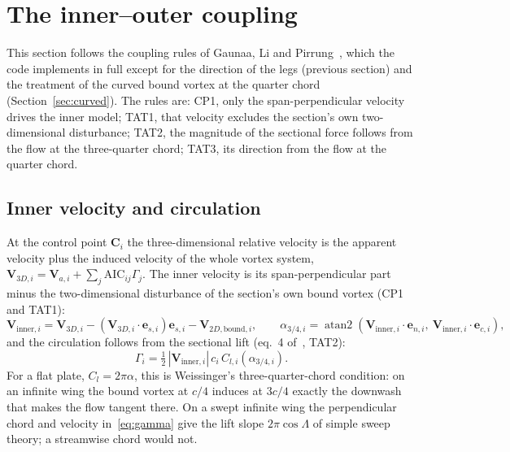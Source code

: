 \documentclass[11pt,a4paper]{article}
\newcommand{\vect}[1]{\mathbf{#1}}
\begin{document}
\section{The inner--outer coupling}
\label{sec:coupling}
This section follows the coupling rules of Gaunaa, Li and Pirrung~\cite{gaunaa2026}, which the code implements in full except for the direction of the legs (previous section) and the treatment of the curved bound vortex at the quarter chord (Section~\ref{sec:curved}). The rules are: CP1, only the span-perpendicular velocity drives the inner model; TAT1, that velocity excludes the section's own two-dimensional disturbance; TAT2, the magnitude of the sectional force follows from the flow at the three-quarter chord; TAT3, its direction from the flow at the quarter chord.

\subsection{Inner velocity and circulation}
\label{sec:gamma}
At the control point $\vect C_i$ the three-dimensional relative velocity is the apparent velocity plus the induced velocity of the whole vortex system, $\vect V_{3D,i}=\vect V_{a,i}+\sum_j \mathrm{AIC}_{ij}\Gamma_j$. The inner velocity is its span-perpendicular part minus the two-dimensional disturbance of the section's own bound vortex (CP1 and TAT1):
\begin{equation}
\vect V_{\mathrm{inner},i}=\vect V_{3D,i}-(\vect V_{3D,i}\cdot\vect e_{s,i})\vect e_{s,i}-\vect V_{2D,\mathrm{bound},i},\qquad
\alpha_{3/4,i}=\operatorname{atan2}(\vect V_{\mathrm{inner},i}\cdot\vect e_{n,i},\ \vect V_{\mathrm{inner},i}\cdot\vect e_{c,i}),
\end{equation}
and the circulation follows from the sectional lift (eq.~4 of~\cite{gaunaa2026}, TAT2):
\begin{equation}
\Gamma_i=\tfrac12\,|\vect V_{\mathrm{inner},i}|\,c_i\,C_{l,i}(\alpha_{3/4,i}).
\label{eq:gamma}
\end{equation}
For a flat plate, $C_l=2\pi\alpha$, this is Weissinger's three-quarter-chord condition: on an infinite wing the bound vortex at $c/4$ induces at $3c/4$ exactly the downwash that makes the flow tangent there. On a swept infinite wing the perpendicular chord and velocity in~\eqref{eq:gamma} give the lift slope $2\pi\cos\Lambda$ of simple sweep theory; a streamwise chord would not.
\end{document}

